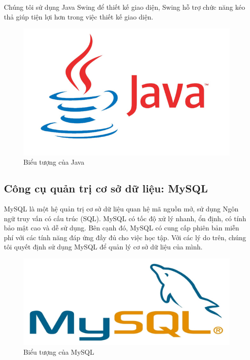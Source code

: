 \documentclass[12pt]{report}
\begin{document}
\begin{itemize}
						Chúng tôi sử dụng Java Swing để thiết kế giao diện, Swing hỗ trợ chức năng kéo thả giúp tiện lợi hơn trong việc thiết kế giao diện.
						\begin{figure}[H]
					\centering
					\includegraphics[scale=0.5]{images/Java.jpg}
					\caption[Biểu tượng của Java]{Biểu tượng của Java \protect\footnotemark{}}
					\label{fig:Java}
					\end{figure}
					\end{itemize}
				\subsection{Công cụ quản trị cơ sở dữ liệu: MySQL}
					\par MySQL là một hệ quản trị cơ sở dữ liệu quan hệ mã nguồn mở, sử dụng Ngôn ngữ truy vấn có cấu trúc (SQL).
						MySQL có tốc độ xử lý nhanh, ổn định, có tính bảo mật cao và dễ sử dụng. Bên cạnh đó, MySQL có cung cấp phiên bản miễn phí với các tính năng đáp ứng đầy đủ cho việc học tập.
						Với các lý do trên, chúng tôi quyết định sử dụng MySQL để quản lý cơ sở dữ liệu của mình.
							\begin{figure}[H]
								\centering
								\includegraphics[scale=0.5]{images/mysql.jpg}
								\caption[Biểu tượng của MySQL]{Biểu tượng của MySQL \protect\footnotemark{}}
								\label{fig:mysql}
							\end{figure}
\end{document}
